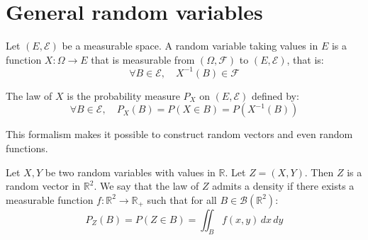\section{General random variables}%
\begin{definition}
Let $(E, \mathcal{E})$ be a measurable space. A random variable taking values in $E$ is a function $X: \Omega \to E$ that is measurable from $(\Omega, \mathcal{F})$ to $(E, \mathcal{E})$, that is:
\[ \forall B \in \mathcal{E}, \quad X^{-1}(B) \in \mathcal{F} \]
\end{definition}%
\begin{definition}
The law of $X$ is the probability measure $P_X$ on $(E, \mathcal{E})$ defined by:
\[ \forall B \in \mathcal{E}, \quad P_X(B) = P(X \in B) = P(X^{-1}(B)) \]
\end{definition}%
This formalism makes it possible to construct random vectors and even random functions.%
\begin{example}
Let $X, Y$ be two random variables with values in $\mathbb{R}$. Let $Z = (X,Y)$. Then $Z$ is a random vector in $\mathbb{R}^2$. We say that the law of $Z$ admits a density if there exists a measurable function $f: \mathbb{R}^2 \to \mathbb{R}_+$ such that for all $B \in \mathcal{B}(\mathbb{R}^2)$:
\[ P_Z(B) = P(Z \in B) = \iint_B f(x,y) \,dx\,dy \]
\end{example}%
